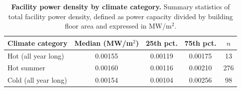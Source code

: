 \documentclass[12pt]{article}
\begin{document}
\begin{table}[H]
\centering
\caption{\textbf{Facility power density by climate category.} 
Summary statistics of total facility power density, defined as power capacity divided by building floor area and expressed in MW/m$^{2}$.}
\label{tab:power_density_climate}
\begin{tabular}{lcccc}
\toprule
Climate category & Median (MW/m$^{2}$) & 25th pct. & 75th pct. & $n$ \\
\midrule
Hot (all year long)       & 0.00155 & 0.00119 & 0.00175 &  13 \\
Hot summer & 0.00160 & 0.00116 & 0.00210 & 276 \\
Cold (all year long)      & 0.00154 & 0.00104 & 0.00256 &  98 \\

\bottomrule
\end{tabular}
\end{table}
\end{document}
